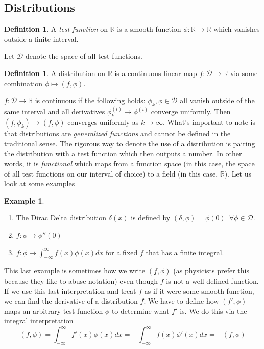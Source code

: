 \documentclass{article}
\newcommand{\R}{\mathbb{R}}
\newcommand{\push}{\,\,\,}
\theoremstyle{definition}
\newtheorem{definition}[theorem]{Definition}
\newtheorem{example}[theorem]{Example}
\begin{document}
\subsection{Distributions}
\begin{definition}
    A \emph{test function} on $\R$ is a smooth function $\phi: \R \to \R$ which vanishes outside a finite interval.
\end{definition}
Let $\mathcal{D}$ denote the space of all test functions. 
\begin{definition}
    A distribution on $\R$ is a continuous linear map $f:\mathcal{D} \to \R$ via some combination $\phi \mapsto (f,\phi)$.
\end{definition}
$f:\mathcal{D}\to \R$ is continuous if the following holds: $\phi_k, \phi \in \mathcal{D}$ all vanish outside of the same interval and all derivatives $\phi_k^{(i)} \to \phi^{(i)}$ converge uniformly. Then $(f,\phi_k) \to (f,\phi)$ converges uniformly as $k\to \infty$. What's important to note is that distributions are \emph{generalized functions} and cannot be defined in the traditional sense. The rigorous way to denote the use of a distribution is pairing the distribution with a test function which then outputs a number. In other words, it is \emph{functional} which maps from a function space (in this case, the space of all test functions on our interval of choice) to a field (in this case, $\R$). Let us look at some examples 
\begin{example}
    \begin{enumerate}
        \item The Dirac Delta distribution $\delta(x)$ is defined by $(\delta, \phi) = \phi (0) \push \forall \phi \in \mathcal{D}$.
        \item $f:\phi \mapsto \phi''(0)$
        \item $\displaystyle{f:\phi \mapsto \int^\infty_{-\infty}f(x)\phi(x)dx}$ for a fixed $f$ that has a finite integral.
    \end{enumerate}
\end{example}
This last example is sometimes how we write $(f,\phi)$ (as physicists prefer this because they like to abuse notation) even though $f$ is not a well defined function. If we use this last interpretation and treat $f$ as if it were some smooth function, we can find the derivative of a distribution $f$. We have to define how $(f',\phi)$ maps an arbitrary test function $\phi$ to determine what $f'$ is. We do this via the integral interpretation 
\begin{equation*}
    (f,\phi) = \int^\infty_{-\infty}f'(x)\phi(x)dx = -\int^\infty_{-\infty} f(x) \phi'(x)dx = -(f,\phi)
\end{equation*}
\end{document}
